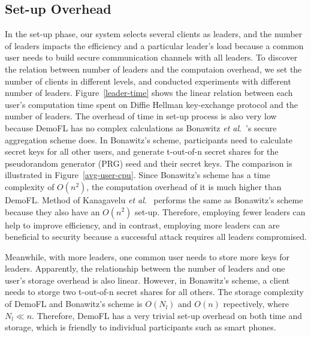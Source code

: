 \subsection{Set-up Overhead}
In the set-up phase, our system selects several clients as leaders, and the number of leaders impacts the efficiency and a particular leader's load because a common user needs to build secure communication channels with all leaders. To discover the relation between number of leaders and the computaion overhead, we set the number of clients in different levels, and conducted experiments with different number of leaders. Figure~\ref{leader-time} shows the linear relation between each user's computation time spent on Diffie Hellman key-exchange protocol and the number of leaders. The overhead of time in set-up process is also very low because DemoFL has no complex calculations as Bonawitz \emph{et al}.~\cite{Practical}'s secure aggregation scheme does. In Bonawitz's scheme, participants need to calculate secret keys for all other users, and generate t-out-of-n secret shares for the pseudorandom generator (PRG) seed and their secret keys. The comparison is illustrated in Figure~\ref{avg-user-cpu}. Since Bonawitz's scheme has a time complexity of $O(n^2)$, the computation overhead of it is much higher than DemoFL. Method of Kanagavelu \emph{et al}.~\cite{Two-Phase} performs the same as Bonawitz's scheme because they also have an $O(n^2)$ set-up. Therefore, employing fewer leaders can help to improve efficiency, and in contrast, employing more leaders can are beneficial to security because a successful attack requires all leaders compromised. 

Meanwhile, with more leaders, one common user needs to store more keys for leaders. Apparently, the relationship between the number of leaders and one user's storage overhead is also linear. However, in Bonawitz's scheme, a client needs to storge two t-out-of-n secret shares for all others. The storage complexity of DemoFL and Bonawitz's scheme is $O(N_l)$ and $O(n)$ repectively, where $N_l \ll n$. Therefore, DemoFL has a very trivial set-up overhead on both time and storage, which is friendly to individual participants such as smart phones.

